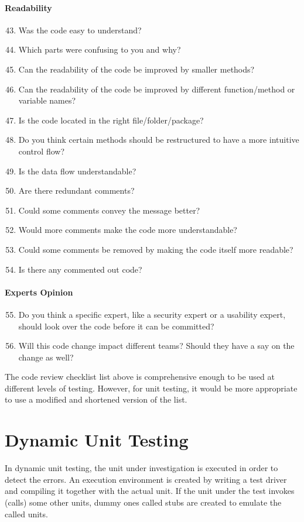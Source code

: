 \paragraph{Readability}
\begin{enumerate}
 \setcounter{enumi}{42}
   \item Was the code easy to understand?
   \item Which parts were confusing to you and why?
   \item Can the readability of the code be improved by smaller methods?
   \item Can the readability of the code be improved by different function/method or variable names?
   \item Is the code located in the right file/folder/package?
   \item Do you think certain methods should be restructured to have a more intuitive control flow?
   \item Is the data flow understandable?
   \item Are there redundant comments?
   \item Could some comments convey the message better?
   \item Would more comments make the code more understandable?
   \item Could some comments be removed by making the code itself more readable?
    \item Is there any commented out code?
\end{enumerate}

\paragraph{Experts Opinion}
\begin{enumerate}
 \setcounter{enumi}{54}
   \item Do you think a specific expert, like a security expert or a usability expert, should look over the code before it can be committed?
   \item Will this code change impact different teams? Should they have a say on the change as well? 
\end{enumerate}

The code review checklist list above is comprehensive enough to be used at different levels of testing. However, for unit testing, it would be more appropriate to use a modified and shortened version of the list.

\section{Dynamic Unit Testing}
In dynamic unit testing, the unit under investigation is executed in order to detect the errors. An execution environment is created by writing a test driver and compiling it together with the actual unit. If the unit under the test invokes (calls) some other units, dummy ones called stubs are created to emulate the called units.

